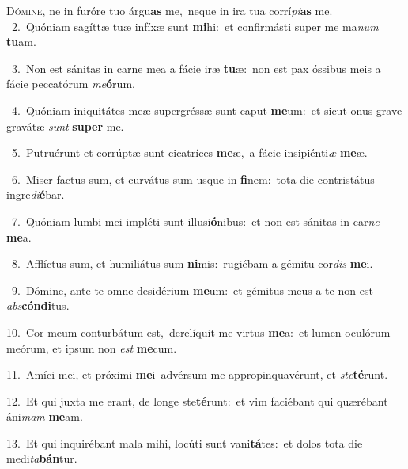 \lettrine{\initial\textcolor{\initialcolor}{D}}{ómine,} ne in furóre tuo árgu\textbf{as} me,~\star neque in ira tua corrí\-\textit{pi}\-\textbf{as} me.\\
{\numbfont\textcolor{\numbcolor}{~2.}}~Quóniam sagíttæ tuæ infíxæ sunt \textbf{mi}\-hi:~\star et confirmásti super me ma\textit{num} \textbf{tu}\-am.\par
{\numbfont\textcolor{\numbcolor}{~3.}}~Non est sánitas in carne mea a fácie iræ \textbf{tu}\-æ:~\star non est pax óssibus meis a fácie peccatórum \textit{me}\-\textbf{ó}rum.\par
{\numbfont\textcolor{\numbcolor}{~4.}}~Quóniam iniquitátes meæ supergréssæ sunt caput \textbf{me}\-um:~\star et sicut onus grave gravátæ \textit{sunt} \textbf{su}\-\textbf{per} me.\par
{\numbfont\textcolor{\numbcolor}{~5.}}~Putruérunt et corrúptæ sunt cicatríces \textbf{me}\-æ,~\star a fácie insipiénti\textit{æ} \textbf{me}\-æ.\par
{\numbfont\textcolor{\numbcolor}{~6.}}~Miser factus sum, et curvátus sum usque in \textbf{fi}\-nem:~\star tota die contristátus ingre\-\textit{di}\-\textbf{é}bar.\par
{\numbfont\textcolor{\numbcolor}{~7.}}~Quóniam lumbi mei impléti sunt illusi\-\textbf{ó}\-nibus:~\star et non est sánitas in car\textit{ne} \textbf{me}\-a.\par
{\numbfont\textcolor{\numbcolor}{~8.}}~Afflíctus sum, et humiliátus sum \textbf{ni}\-mis:~\star rugiébam a gémitu cor\textit{dis} \textbf{me}\-i.\par
{\numbfont\textcolor{\numbcolor}{~9.}}~Dómine, ante te omne desidérium \textbf{me}\-um:~\star et gémitus meus a te non est \textit{abs}\-\textbf{cón}\textbf{di}tus.\par
{\numbfont\textcolor{\numbcolor}{10.}}~Cor meum conturbátum est,~\dagger derelíquit me virtus \textbf{me}\-a:~\star et lumen oculórum meórum, et ipsum non \textit{est} \textbf{me}\-cum.\par
{\numbfont\textcolor{\numbcolor}{11.}}~Amíci mei, et próximi \textbf{me}\-i~\star advérsum me appropinquavérunt, et \textit{ste}\-\textbf{té}runt.\par
{\numbfont\textcolor{\numbcolor}{12.}}~Et qui juxta me erant, de longe ste\-\textbf{té}\-runt:~\star et vim faciébant qui quærébant áni\textit{mam} \textbf{me}\-am.\par
{\numbfont\textcolor{\numbcolor}{13.}}~Et qui inquirébant mala mihi, locúti sunt vani\-\textbf{tá}\-tes:~\star et dolos tota die medi\-\textit{ta}\-\textbf{bán}tur.\par
